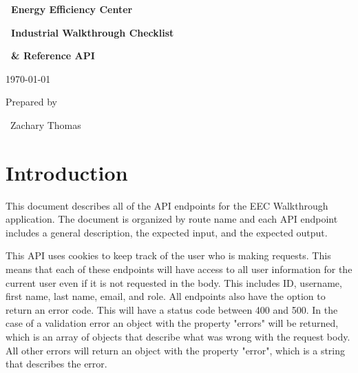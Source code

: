 \documentclass[onecolumn, draftclsnofoot,10pt, compsoc, usenames, dvipsnames]{IEEEtran}
\begin{document}
\begin{titlepage}
        \begin{center}
    	\end{center}
        \hfill 
        \par\vspace{.2in}
        \centering
        \scshape{
            \vspace{50pt}

            \textbf{\Huge\ Energy Efficiency Center}\par
            \vspace{5pt}
            \textbf{\Huge\ Industrial Walkthrough Checklist}\par
            \vspace{5pt}
            \textbf{\Huge\ \& Reference API}\par
            \vspace{10pt}
            {\large\today}\par
            \vspace{350pt}
            {\large Prepared by }\par
            \vspace{15pt}
            {\Huge\ Zachary Thomas}
            \vspace{30pt}
        }
\end{titlepage}
\newpage
{}
\tableofcontents
\clearpage

\section{Introduction}
This document describes all of the API endpoints for the EEC Walkthrough application.
The document is organized by route name and each API endpoint includes a general description, the expected input, and  the expected output.

This API uses cookies to keep track of the user who is making requests. This means that each of these endpoints will have access to all user information for the current user even if it is not requested in the body. This includes ID, username, first name, last name, email, and role. All endpoints also have the option to return an error code. This will have a status code between 400 and 500. In the case of a validation error an object with the property "errors" will be returned, which is an array of objects that describe what was wrong with the request body. All other errors will return an object with the property "error", which is a string that describes the error.
\end{document}
